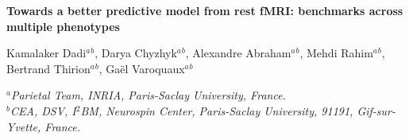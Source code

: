 \documentclass[12pt]{article}
\begin{document}
\begin{center}
{\large\bf Towards a better predictive model from rest fMRI: benchmarks across
multiple phenotypes}\\[4mm]
\end{center}

\begin{center}
Kamalaker Dadi$^a$$^b$, Darya Chyzhyk$^a$$^b$, Alexandre Abraham$^a$$^b$,
Mehdi Rahim$^a$$^b$, Bertrand Thirion$^a$$^b$, Ga\"el Varoquaux$^a$$^b$\\
\end{center}

\begin{center}
{\small \em $^a$Parietal Team, INRIA, Paris-Saclay
University, France.}\\
{\small \em $^b$CEA, DSV, I$^{2}$BM, Neurospin Center,
Paris-Saclay University, 91191, Gif-sur-Yvette, France.}\\
\end{center}
\end{document}
